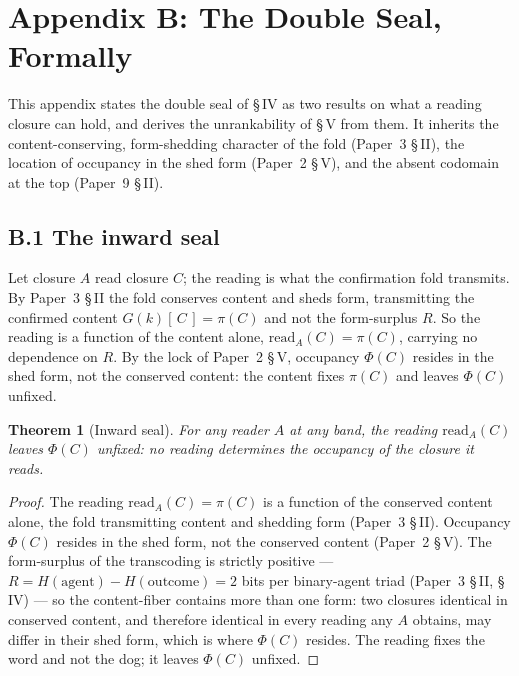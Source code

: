\documentclass[11pt,oneside]{report}
\newtheorem{theorem}{Theorem}[section]
\theoremstyle{definition}
\theoremstyle{remark}
\begin{document}
\section*{Appendix B: The Double Seal, Formally}

This appendix states the double seal of \S\,IV as two results on what a reading closure can hold, and derives the unrankability of \S\,V from them. It inherits the content-conserving, form-shedding character of the fold (Paper~3 \S\,II), the location of occupancy in the shed form (Paper~2 \S\,V), and the absent codomain at the top (Paper~9 \S\,II).

\subsection*{B.1 The inward seal}

Let closure \ensuremath{A} read closure \ensuremath{C}; the reading is what the confirmation fold transmits. By Paper~3 \S\,II the fold conserves content and sheds form, transmitting the confirmed content \ensuremath{G(k)[\,C\,] = \pi(C)} and not the form-surplus \ensuremath{R}. So the reading is a function of the content alone, \ensuremath{\mathrm{read}_A(C) = \pi(C)}, carrying no dependence on \ensuremath{R}. By the lock of Paper~2 \S\,V, occupancy \ensuremath{\Phi(C)} resides in the shed form, not the conserved content: the content fixes \ensuremath{\pi(C)} and leaves \ensuremath{\Phi(C)} unfixed.

\begin{theorem}[Inward seal]
For any reader \ensuremath{A} at any band, the reading \ensuremath{\mathrm{read}_A(C)} leaves \ensuremath{\Phi(C)} unfixed: no reading determines the occupancy of the closure it reads.
\end{theorem}

\begin{proof}
The reading \ensuremath{\mathrm{read}_A(C) = \pi(C)} is a function of the conserved content alone, the fold transmitting content and shedding form (Paper~3 \S\,II). Occupancy \ensuremath{\Phi(C)} resides in the shed form, not the conserved content (Paper~2 \S\,V). The form-surplus of the transcoding is strictly positive --- \ensuremath{R = H(\text{agent}) - H(\text{outcome}) = 2} bits per binary-agent triad (Paper~3 \S\,II, \S\,IV) --- so the content-fiber contains more than one form: two closures identical in conserved content, and therefore identical in every reading any \ensuremath{A} obtains, may differ in their shed form, which is where \ensuremath{\Phi(C)} resides. The reading fixes the word and not the dog; it leaves \ensuremath{\Phi(C)} unfixed.
\end{proof}
\end{document}
